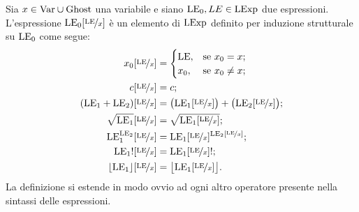 \begin{definizione} 
Sia $x \in \mathrm{Var} \cup \mathrm{Ghost}$ una variabile e siano $\mathrm{LE}_0, LE \in \mathrm{LExp}$
due espressioni.
L'espressione $\mathrm{LE}_0[\nicefrac{\mathrm{LE}}{x}]$ è un elemento di $\mathrm{LExp}$ definito
per induzione strutturale su $\mathrm{LE}_0$ come segue:
\begin{align*}
   x_0[\nicefrac{\mathrm{LE}}{x}]
    &=
      \begin{cases}
        \mathrm{LE}, &\text{se $x_0 = x$;} \\
        x_0, &\text{se $x_0 \neq x$;}
      \end{cases} \\
   c[\nicefrac{\mathrm{LE}}{x}]
    &= c;\\
  (\mathrm{LE}_1 + \mathrm{LE}_2)[\nicefrac{\mathrm{LE}}{x}]
     &= \bigl(\mathrm{LE}_1[\nicefrac{\mathrm{LE}}{x}]\bigr) + \bigl(\mathrm{LE}_2[\nicefrac{\mathrm{LE}}{x}]\bigr);\\
  \sqrt{\mathrm{LE}_1}[\nicefrac{\mathrm{LE}}{x}]
     &= \sqrt{{\mathrm{LE}_1}[\nicefrac{\mathrm{LE}}{x}]};\\
  \mathrm{LE}_1^{\mathrm{LE}_2}[\nicefrac{\mathrm{LE}}{x}]
     &= \mathrm{LE}_1[\nicefrac{\mathrm{LE}}{x}]^{\mathrm{LE}_2[\nicefrac{\mathrm{LE}}{x}]};\\
  {\mathrm{LE}_1}![\nicefrac{\mathrm{LE}}{x}]
     &= {{\mathrm{LE}_1}[\nicefrac{\mathrm{LE}}{x}]}!;\\
  \lfloor \mathrm{LE}_1 \rfloor[\nicefrac{\mathrm{LE}}{x}]
     &= \bigl\lfloor \mathrm{LE}_1[\nicefrac{\mathrm{LE}}{x}] \bigr\rfloor.\\
\end{align*}
La definizione si estende in modo ovvio ad ogni altro operatore presente
nella sintassi delle espressioni.
\end{definizione}

